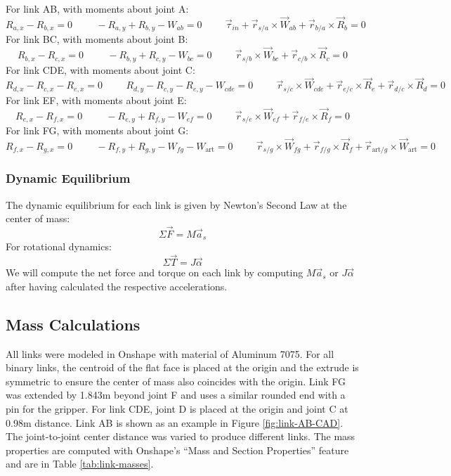 \documentclass[12pt]{article}
\newcommand\hs{\hspace{1cm}}
\begin{document}
For link AB, with moments about joint A:
\[ R_{a,x} - R_{b,x} = 0 \hs -R_{a,y} + R_{b,y} - W_{ab} = 0 \hs \vec{\tau}_{in} + \vec{r}_{s/a}\times \vec{W}_{ab} + \vec{r}_{b/a}\times \vec{R}_{b} = 0 \]
For link BC, with moments about joint B:
\[ R_{b,x} - R_{c,x} = 0 \hs -R_{b,y} + R_{c,y} - W_{bc} = 0 \hs \vec{r}_{s/b}\times \vec{W}_{bc} + \vec{r}_{c/b}\times \vec{R}_{c} = 0 \]
For link CDE, with moments about joint C:
\[ R_{d,x} - R_{c,x} - R_{e,x} = 0 \hs R_{d,y} - R_{c,y} - R_{e,y} - W_{cde} = 0 \hs \vec{r}_{s/c}\times \vec{W}_{cde} + \vec{r}_{e/c}\times \vec{R}_{e} + \vec{r}_{d/c}\times \vec{R}_{d} = 0 \]
For link EF, with moments about joint E:
\[ R_{e,x} - R_{f,x} = 0 \hs -R_{e,y} + R_{f,y} - W_{ef} = 0 \hs \vec{r}_{s/e}\times \vec{W}_{ef} + \vec{r}_{f/e}\times \vec{R}_{f} = 0 \]
For link FG, with moments about joint G:
\[ R_{f,x} - R_{g,x} = 0 \hs -R_{f,y} + R_{g,y} - W_{fg} - W_{\text{art}} = 0 \hs \vec{r}_{s/g}\times \vec{W}_{fg} + \vec{r}_{f/g}\times \vec{R}_{f} + \vec{r}_{\text{art}/g}\times \vec{W}_{\text{art}} = 0 \]

\subsubsection{Dynamic Equilibrium}%
\label{eqns.forces-moments.dynamic}

The dynamic equilibrium for each link is given by Newton's Second Law at the center of mass:
\[ \Sigma \vec{F} = M \vec{a}_{s} \]
For rotational dynamics:
\[ \Sigma \vec{T} = J \vec{\alpha} \]
We will compute the net force and torque on each link by computing $M \vec{a}_{s}$ or $J \vec{\alpha}$ after having calculated the respective accelerations.

\subsection{Mass Calculations}%
\label{eqns.masses}

All links were modeled in Onshape with material of Aluminum 7075. For all binary links, the centroid of the flat face is placed at the origin and the extrude is symmetric to ensure the center of mass also coincides with the origin. Link FG was extended by 1.843m beyond joint F and uses a similar rounded end with a pin for the gripper. For link CDE, joint D is placed at the origin and joint C at 0.98m distance.  Link AB is shown as an example in Figure \ref{fig:link-AB-CAD}. The joint-to-joint center distance was varied to produce different links. The mass properties are computed with Onshape's ``Mass and Section Properties'' feature and are in Table \ref{tab:link-masses}.
\end{document}
